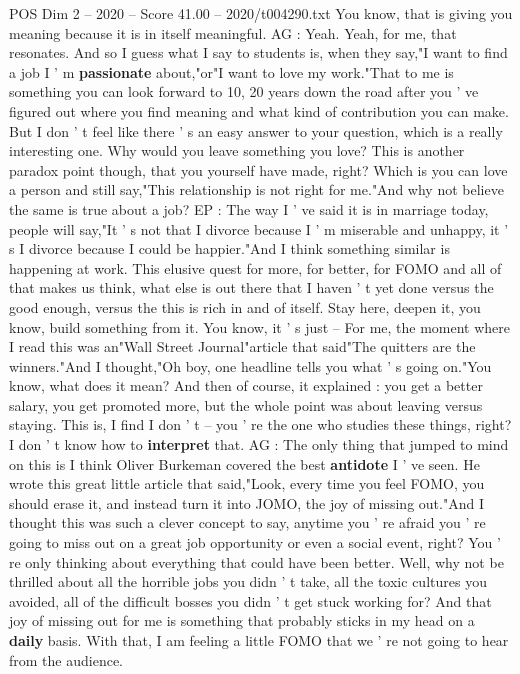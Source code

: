 \begin{textsample}{POS Dim 2 – 2020 – Score 41.00 – 2020/t004290.txt}
You know, that is giving you meaning because it is in itself meaningful.
AG : Yeah.
Yeah, for me, that resonates.
And so I guess what I say to students is, when they say,"I want to find a job I ' m \textbf{passionate} about,"or"I want to love my work."That to me is something you can look forward to 10, 20 years down the road after you ' ve figured out where you find meaning and what kind of contribution you can make.
But I don ' t feel like there ' s an easy answer to your question, which is a really interesting one.
Why would you leave something you love?
This is another paradox point though, that you yourself have made, right?
Which is you can love a person and still say,"This relationship is not right for me."And why not believe the same is true about a job?
EP : The way I ' ve said it is in marriage today, people will say,"It ' s not that I divorce because I ' m miserable and unhappy, it ' s I divorce because I could be happier."And I think something similar is happening at work.
This elusive quest for more, for better, for FOMO and all of that makes us think, what else is out there that I haven ' t yet done versus the good enough, versus the this is rich in and of itself.
Stay here, deepen it, you know, build something from it.
You know, it ' s just -- For me, the moment where I read this was an"Wall Street Journal"article that said"The quitters are the winners."And I thought,"Oh boy, one headline tells you what ' s going on."You know, what does it mean?
And then of course, it explained : you get a better salary, you get promoted more, but the whole point was about leaving versus staying.
This is, I find I don ' t -- you ' re the one who studies these things, right?
I don ' t know how to \textbf{interpret} that.
AG : The only thing that jumped to mind on this is I think Oliver Burkeman covered the best \textbf{antidote} I ' ve seen.
He wrote this great little article that said,"Look, every time you feel FOMO, you should erase it, and instead turn it into JOMO, the joy of missing out."And I thought this was such a clever concept to say, anytime you ' re afraid you ' re going to miss out on a great job opportunity or even a social event, right?
You ' re only thinking about everything that could have been better.
Well, why not be thrilled about all the horrible jobs you didn ' t take, all the toxic cultures you avoided, all of the difficult bosses you didn ' t get stuck working for?
And that joy of missing out for me is something that probably sticks in my head on a \textbf{daily} basis.
With that, I am feeling a little FOMO that we ' re not going to hear from the audience.

\end{textsample}
